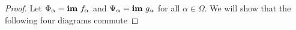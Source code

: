 \begin{proof}


  Let $\Phi_\alpha = \mathbf{im}~f_\alpha$ and $\Psi_\alpha = \mathbf{im}~g_\alpha$ for all $\alpha\in\Omega$.
  We will show that the following four diagrams commute


\end{proof}
